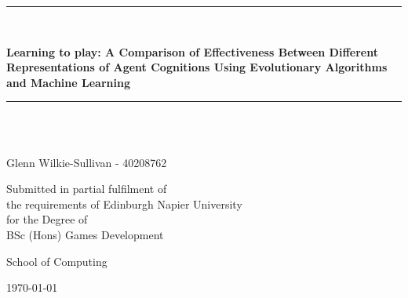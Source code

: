 \newcommand{\HRule}{\rule{\linewidth}{0.5mm}}

\begin{titlepage}
	\begin{center}

	\HRule \\[0.4cm]
    	{\Large \bfseries Learning to play: A Comparison of Effectiveness Between Different Representations of Agent Cognitions Using Evolutionary Algorithms and Machine Learning\par}
	\vspace{0.2cm}
	\HRule \\[1.5cm]

	
    	\vspace{3cm}
	\begin{minipage}{0.4\textwidth}
	\begin{center} \large
        \emph{}\\
        	Glenn Wilkie-Sullivan - 40208762
				
   	 \end{center}
    	\end{minipage}
	
	\vspace{2cm}
    	\begin{minipage}{1\textwidth}
    	\begin{center} \large
        
		Submitted in partial fulfilment of \\
		the requirements of Edinburgh Napier University \\
		for the Degree of \\
        	BSc (Hons) Games Development
    	\end{center}
    	\end{minipage}

    	\vfill

	\begin{minipage}{1\textwidth}
    	\begin{center} \large
		School of Computing
    	\end{center}
    	\end{minipage}
	
	\vspace{1cm}
    	{\large \today}


	\end{center}
\end{titlepage}
